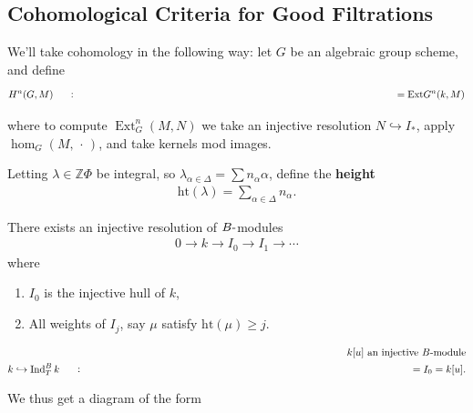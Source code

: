 \hypertarget{cohomological-criteria-for-good-filtrations}{%
\subsection{Cohomological Criteria for Good
Filtrations}\label{cohomological-criteria-for-good-filtrations}}

We'll take cohomology in the following way: let \(G\) be an algebraic
group scheme, and define
\begin{align*}   H^n(G, M) \mathrel{\vcenter{:}}= \mathrm{Ext} G^n(k, M) \end{align*}

where to compute \(\operatorname{Ext}_G^n(M, N)\) we take an injective
resolution \(N \hookrightarrow I_*\), apply \(\hom_G(M, {\,\cdot\,})\),
and take kernels mod images.

Letting \(\lambda \in {\mathbb{Z}}\Phi\) be integral, so
\(\lambda_{\alpha \in \Delta} = \sum n_\alpha \alpha\), define the
\textbf{height}
\begin{align*}   \text{ht}(\lambda) = \sum_{\alpha\in\Delta} n_\alpha .\end{align*}

\begin{lemma}[?]

\begin{lemma}[?]

There exists an injective resolution of \(B{\hbox{-}}\)modules
\begin{align*}   0\to k\to I_0 \to I_1 \to \cdots \end{align*} where

\begin{enumerate}
\def\labelenumi{\arabic{enumi}.}
\tightlist
\item
  \(I_0\) is the injective hull of \(k\),
\item
  All weights of \(I_j\), say \(\mu\) satisfy \(\text{ht}(\mu) \geq j\).
\end{enumerate}

\end{lemma}

\end{lemma}

\begin{align*}   k[u] \text{ an injective $B{\hbox{-}}$module} \\ k\hookrightarrow\operatorname{Ind}_T^B k \mathrel{\vcenter{:}}= I_0 = k[u] .\end{align*}

We thus get a diagram of the form

